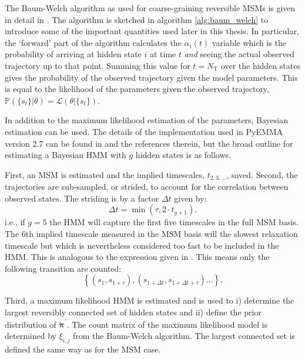 The Baum-Welch algorithm as used for coarse-graining reversible MSMs is given in detail in \cite{noeProjectedHiddenMarkov2013a}. The algorithm is sketched in algorithm \ref{alg:baum_welch} to introduce some of the important quantities used later in this thesis. In particular, the `forward' part of the algorithm calculates the $\alpha_{i}(t)$ variable which is the probability of arriving at hidden state $i$ at time $t$ \emph{and} seeing the actual observed trajectory up to that point.\cite{rabinerTutorialHiddenMarkov1989} Summing this value for $t=N_{\mathrm{T}}$ over the hidden states gives the probability of the observed trajectory given the model parameters.\cite{rabinerTutorialHiddenMarkov1989} This is equal to the likelihood of the parameters given the observed trajectory, $\mathbb{P}(\{s_{t}\}|\theta)=\mathcal{L}(\theta|\{s_{t}\})$.\cite{rabinerTutorialHiddenMarkov1989} 

In addition to the maximum likelihood estimation of the parameters, Bayesian estimation can be used. The details of the implementation used in PyEMMA version 2.7 \cite{schererPyEMMASoftwarePackage2015a} can be found in \cite{choderaBayesianHiddenMarkov2011a} and the references therein, but the broad outline for estimating a Bayesian HMM with $g$ hidden states is as follows. 

First, an MSM is estimated and the implied timescales, $t_{2,3, \ldots}$, saved. Second, the trajectories are sub-sampled, or strided, to account for the correlation between observed states. The striding is by a factor $\Delta t$ given by:
\begin{equation}\label{eqn:hmm_striding}
    \Delta t = \min{\left(\tau, 2\cdot t_{g+1}\right)}. 
\end{equation}
i.e., if $g=5$ the HMM will  capture the first five timescales in the full MSM basis. The $6$th implied timescale measured in the MSM basis will the slowest relaxation timescale but which is nevertheless considered too fast to be included in the HMM. This is analogous to the expression given in \cite{noeStatisticalInefficiencyMarkov}.  This means only the following transition are counted: 
\begin{equation}
    \left\{(s_{1}, s_{1+\tau}), (s_{1+\Delta t}, s_{1+\Delta t + \tau}) \ldots \right \}.
\end{equation}

Third, a maximum likelihood HMM is estimated and is used to i) determine the largest reversibly connected set of hidden states and ii) define the prior distribution of  $\widetilde{\bm{\pi}}^{\prime}$. The count matrix of the maximum likelihood model is determined by $\xi_{i,j}$ from the Baum-Welch algorithm. The largest connected set is defined the same way as for the MSM case. 

